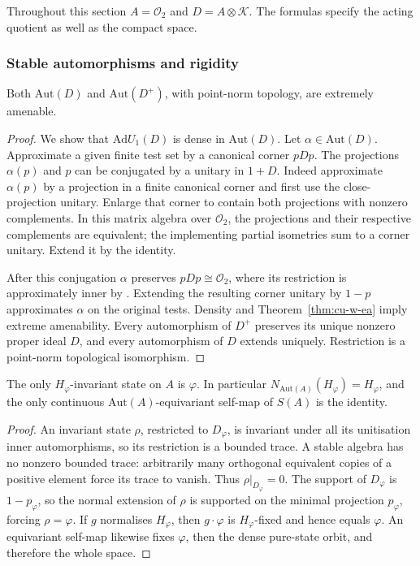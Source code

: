 \label{sec:cu-related}

Throughout this section $A=\mathcal{O}_2$ and $D=A\otimes\mathcal{K}$. The
formulas specify the acting quotient as well as the compact space.


\subsubsection{Stable automorphisms and rigidity}

\begin{corollary}\label{cor:cu-stable-o2}
 Both $\mathrm{Aut}(D)$ and $\mathrm{Aut}(D^+)$, with
point-norm topology, are extremely amenable.
\end{corollary}

\begin{proof}
We show that $\mathrm{Ad} U_1(D)$ is dense in $\mathrm{Aut}(D)$. Let $\alpha\in\mathrm{Aut}(D)$. Approximate a given finite test set by a
canonical corner $pDp$. The projections $\alpha(p)$ and $p$ can be
conjugated by a unitary in $1+D$. Indeed approximate $\alpha(p)$ by a
projection in a finite canonical corner and first use the close-projection
unitary. Enlarge that corner to contain both projections with nonzero
complements. In this matrix algebra over $\mathcal{O}_2$, the projections
and their respective complements are equivalent; the implementing partial
isometries sum to a corner unitary. Extend it by the identity.

After this conjugation $\alpha$ preserves $pDp\cong\mathcal{O}_2$, where its
restriction is approximately inner by \cite{KirchbergPhillips2000}. Extending the resulting
corner unitary by $1-p$ approximates $\alpha$ on the original tests. Density
and Theorem~\ref{thm:cu-w-ea} imply extreme amenability. Every automorphism of $D^+$ preserves its unique nonzero proper ideal $D$, and every automorphism
of $D$ extends uniquely. Restriction is a point-norm topological isomorphism.
\end{proof}

\begin{proposition}\label{prop:cu-rigidity}
 The only $H_\varphi$-invariant state on $A$ is $\varphi $. In particular $N_{\mathrm{Aut}(A)}(H_\varphi)=H_\varphi$, and the
only continuous $\mathrm{Aut}(A)$-equivariant self-map of $S(A)$ is the
identity.
\end{proposition}

\begin{proof}
An invariant state $\rho$, restricted to $D_\varphi$, is invariant under all
its unitisation inner automorphisms, so its restriction is a bounded trace.
A stable algebra has no nonzero bounded trace: arbitrarily many orthogonal
equivalent copies of a positive element force its trace to vanish. Thus $\rho|_{D_\varphi}=0$. The support of $D_\varphi$ is $1-p_\varphi$, so the
normal extension of $\rho$ is supported on the minimal projection $p_\varphi$, forcing $\rho=\varphi$. If $g$ normalises $H_\varphi$, then $g\cdot\varphi$
is $H_\varphi$-fixed and hence equals $\varphi$. An equivariant self-map
likewise fixes $\varphi$, then the dense pure-state orbit, and therefore the
whole space.
\end{proof}

